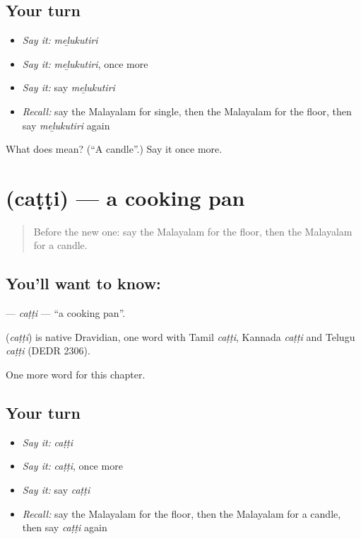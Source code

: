 \subsection*{Your turn}
\begin{itemize}
\raggedright
  \item \emph{Say it:} \emph{meḻukutiri}
  \item \emph{Say it:} \emph{meḻukutiri}, once more
  \item \emph{Say it:} say \emph{meḻukutiri}
  \item \emph{Recall:} say the Malayalam for single, then the Malayalam for the floor, then say \emph{meḻukutiri} again
\end{itemize}

\begin{tcolorbox}[breakable,colback=teal!4,colframe=teal!35!black,title={Before you move on}]
What does  mean? (\textquotedblleft{}A candle\textquotedblright{}.) Say it once more.
\end{tcolorbox}
\section[\texorpdfstring{\ml{ചട്ടി} (caṭṭi)}{ചട്ടി (caṭṭi)}]{ (caṭṭi) — a cooking pan}

\label{lesson:ML-C207-catti}



\begin{quote}
Before the new one: say the Malayalam for the floor, then the Malayalam for a candle.
\end{quote}

\subsection*{You'll want to know: }
\textbf{} — \emph{caṭṭi} — \textquotedblleft{}a cooking pan\textquotedblright{}.

\begin{cousinweb}
\textbf{} (\emph{caṭṭi}) is native Dravidian, one word with Tamil \emph{caṭṭi}, Kannada \emph{caṭṭi} and Telugu \emph{caṭṭi} (DEDR 2306).
\end{cousinweb}

\begin{grammarlens}[title={What you've built}]
One more word for this chapter.
\end{grammarlens}

\subsection*{Your turn}
\begin{itemize}
\raggedright
  \item \emph{Say it:} \emph{caṭṭi}
  \item \emph{Say it:} \emph{caṭṭi}, once more
  \item \emph{Say it:} say \emph{caṭṭi}
  \item \emph{Recall:} say the Malayalam for the floor, then the Malayalam for a candle, then say \emph{caṭṭi} again
\end{itemize}

